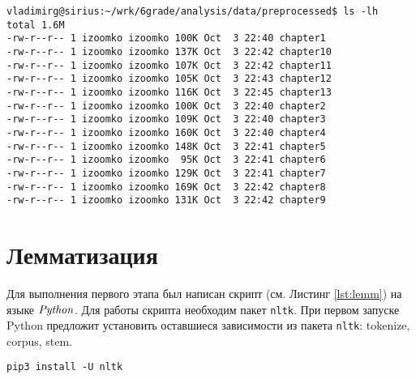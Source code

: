 \documentclass[12pt, a4paper] {article}
\begin{document}
\begin{lstlisting}[label=lst:files,caption=Список файлов после разделения книги на главы]
vladimirg@sirius:~/wrk/6grade/analysis/data/preprocessed$ ls -lh
total 1.6M
-rw-r--r-- 1 izoomko izoomko 100K Oct  3 22:40 chapter1
-rw-r--r-- 1 izoomko izoomko 137K Oct  3 22:42 chapter10
-rw-r--r-- 1 izoomko izoomko 107K Oct  3 22:42 chapter11
-rw-r--r-- 1 izoomko izoomko 105K Oct  3 22:43 chapter12
-rw-r--r-- 1 izoomko izoomko 116K Oct  3 22:45 chapter13
-rw-r--r-- 1 izoomko izoomko 100K Oct  3 22:40 chapter2
-rw-r--r-- 1 izoomko izoomko 109K Oct  3 22:40 chapter3
-rw-r--r-- 1 izoomko izoomko 160K Oct  3 22:40 chapter4
-rw-r--r-- 1 izoomko izoomko 148K Oct  3 22:41 chapter5
-rw-r--r-- 1 izoomko izoomko  95K Oct  3 22:41 chapter6
-rw-r--r-- 1 izoomko izoomko 129K Oct  3 22:41 chapter7
-rw-r--r-- 1 izoomko izoomko 169K Oct  3 22:42 chapter8
-rw-r--r-- 1 izoomko izoomko 131K Oct  3 22:42 chapter9
\end{lstlisting}

\section{Лемматизация}
Для выполнения первого этапа был написан скрипт (см. Листинг \ref{lst:lemm}) на языке $\it Python$. Для работы скрипта необходим пакет \texttt{nltk}. При первом запуске Python предложит установить оставшиеся зависимости из пакета \texttt{nltk}: tokenize, corpus, stem.

\texttt{pip3 install -U nltk}
\end{document}
